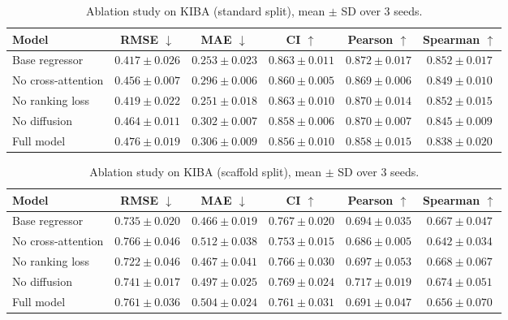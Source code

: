 
\begin{table}[ht]
\centering
\caption{Ablation study on KIBA (standard split), mean $\pm$ SD over 3 seeds.}
\label{tab:ablation_standard}
\begingroup
\setlength{\tabcolsep}{4pt}
\renewcommand{\arraystretch}{1.05}
\footnotesize
\begin{tabular}{lccccc}
\toprule
Model & RMSE $\downarrow$ & MAE $\downarrow$ & CI $\uparrow$ & Pearson $\uparrow$ & Spearman $\uparrow$ \\
\midrule
Base regressor & $\mathbf{0.417}{\pm}\mathbf{0.026}$ & $0.253{\pm}0.023$ & $0.863{\pm}0.011$ & $\mathbf{0.872}{\pm}\mathbf{0.017}$ & $0.852{\pm}0.017$ \\
No cross-attention & $0.456{\pm}0.007$ & $0.296{\pm}0.006$ & $0.860{\pm}0.005$ & $0.869{\pm}0.006$ & $0.849{\pm}0.010$ \\
No ranking loss & $0.419{\pm}0.022$ & $\mathbf{0.251}{\pm}\mathbf{0.018}$ & $\mathbf{0.863}{\pm}\mathbf{0.010}$ & $0.870{\pm}0.014$ & $\mathbf{0.852}{\pm}\mathbf{0.015}$ \\
No diffusion & $0.464{\pm}0.011$ & $0.302{\pm}0.007$ & $0.858{\pm}0.006$ & $0.870{\pm}0.007$ & $0.845{\pm}0.009$ \\
Full model & $0.476{\pm}0.019$ & $0.306{\pm}0.009$ & $0.856{\pm}0.010$ & $0.858{\pm}0.015$ & $0.838{\pm}0.020$ \\
\bottomrule
\end{tabular}
\endgroup
\end{table}

\begin{table}[ht]
\centering
\caption{Ablation study on KIBA (scaffold split), mean $\pm$ SD over 3 seeds.}
\label{tab:ablation_scaffold}
\begingroup
\setlength{\tabcolsep}{4pt}
\renewcommand{\arraystretch}{1.05}
\footnotesize
\begin{tabular}{lccccc}
\toprule
Model & RMSE $\downarrow$ & MAE $\downarrow$ & CI $\uparrow$ & Pearson $\uparrow$ & Spearman $\uparrow$ \\
\midrule
Base regressor & $0.735{\pm}0.020$ & $\mathbf{0.466}{\pm}\mathbf{0.019}$ & $0.767{\pm}0.020$ & $0.694{\pm}0.035$ & $0.667{\pm}0.047$ \\
No cross-attention & $0.766{\pm}0.046$ & $0.512{\pm}0.038$ & $0.753{\pm}0.015$ & $0.686{\pm}0.005$ & $0.642{\pm}0.034$ \\
No ranking loss & $\mathbf{0.722}{\pm}\mathbf{0.046}$ & $0.467{\pm}0.041$ & $0.766{\pm}0.030$ & $0.697{\pm}0.053$ & $0.668{\pm}0.067$ \\
No diffusion & $0.741{\pm}0.017$ & $0.497{\pm}0.025$ & $\mathbf{0.769}{\pm}\mathbf{0.024}$ & $\mathbf{0.717}{\pm}\mathbf{0.019}$ & $\mathbf{0.674}{\pm}\mathbf{0.051}$ \\
Full model & $0.761{\pm}0.036$ & $0.504{\pm}0.024$ & $0.761{\pm}0.031$ & $0.691{\pm}0.047$ & $0.656{\pm}0.070$ \\
\bottomrule
\end{tabular}
\endgroup
\end{table}
